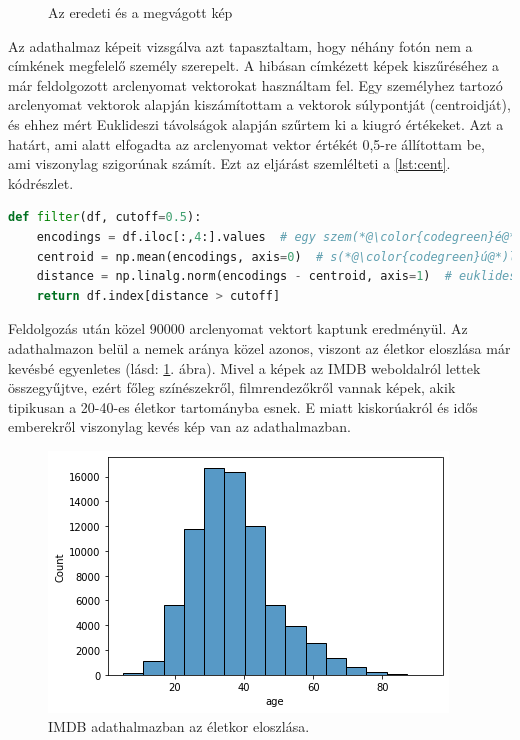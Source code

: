 \begin{figure}[ht]
\begin{subfigure}[b]{0.42\columnwidth}
     \end{subfigure}
        \caption{Az eredeti és a megvágott kép}
\end{figure}


Az adathalmaz képeit vizsgálva azt tapasztaltam, hogy néhány fotón nem a címkének megfelelő személy szerepelt. A hibásan címkézett képek kiszűréséhez a már feldolgozott arclenyomat vektorokat használtam fel. Egy személyhez tartozó arclenyomat vektorok alapján kiszámítottam a vektorok súlypontját (centroidját), és ehhez mért Euklideszi távolságok alapján szűrtem ki a kiugró értékeket. Azt a határt, ami alatt elfogadta az arclenyomat vektor értékét 0,5-re állítottam be, ami viszonylag szigorúnak számít. Ezt az eljárást szemlélteti a \ref{lst:cent}. kódrészlet.

\begin{lstlisting}[language=python, caption={Arclenyomatok szűrése távolság alapján.}, label=lst:cent]
def filter(df, cutoff=0.5):
	encodings = df.iloc[:,4:].values  # egy szem(*@\color{codegreen}é@*)lyhez tartoz(*@\color{codegreen}ó@*) arclenyomatok
	centroid = np.mean(encodings, axis=0)  # s(*@\color{codegreen}ú@*)lypont sz(*@\color{codegreen}á@*)m(*@\color{codegreen}í@*)t(*@\color{codegreen}á@*)s
	distance = np.linalg.norm(encodings - centroid, axis=1)  # euklideszi t(*@\color{codegreen}á@*)vols(*@\color{codegreen}á@*)g
	return df.index[distance > cutoff]
\end{lstlisting}

Feldolgozás után közel 90000 arclenyomat vektort kaptunk eredményül. Az adathalmazon belül a nemek aránya közel azonos, viszont az életkor eloszlása már kevésbé egyenletes (lásd: \ref{fig:agedist}. ábra). Mivel a képek az IMDB weboldalról lettek összegyűjtve, ezért főleg színészekről, filmrendezőkről vannak képek, akik tipikusan a 20-40-es életkor tartományba esnek. E miatt kiskorúakról és idős emberekről viszonylag kevés kép van az adathalmazban.

\begin{figure}[ht]
	\centering
	\includegraphics[width=0.7\columnwidth]{figures/IMDB_age_dist.png}
	\caption{IMDB adathalmazban az életkor eloszlása.}
	\label{fig:agedist}
\end{figure}

